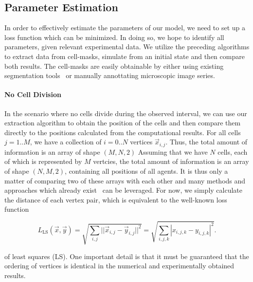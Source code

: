 \documentclass{article}
\begin{document}
\subsection{Parameter Estimation}
\label{section:parameter-estimation}
In order to effectively estimate the parameters of our model, we need to set up a loss function
which can be minimized.
In doing so, we hope to identify all parameters, given relevant experimental data.
We utilize the preceding algorithms to extract data from cell-masks, simulate from an initial state
and then compare both results.
The cell-masks are easily obtainable by either using existing segmentation
tools~\cite{Cutler2022,Stringer2020,Hardo2022} or manually annottating microscopic image series.

\paragraph{No Cell Division}
In the scenario where no cells divide during the observed interval, we can use our extraction
algorithm to obtain the position of the cells and then compare them directly to the positions
calculated from the computational results.
For all cells $j=1..M$, we have a collection of $i=0..N$ vertices $\vec{x}_{i,j}$.
Thus, the total amount of information is an array of shape $(M,N,2)$
Assuming that we have $N$ cells, each of which is represented by $M$ vertcies, the total amount of
information is an array of shape $(N,M,2)$, containing all positions of all agents.
It is thus only a matter of comparing two of these arrays with each other and many methods and
approaches which already exist~\cite{Wang2020} can be leveraged.
For now, we simply calculate the distance of each vertex pair, which is equivalent to the
well-known loss function

\begin{equation}
    L_{\text{LS}}(\vec{x}, \vec{y})
        = \sqrt{\sum\limits_{i,j}||\vec{x}_{i,j}-\vec{y}_{i,j}||^2}
        = \sqrt{\sum\limits_{i,j,k}|x_{i,j,k}-y_{i,j,k}|^2}.
\end{equation}

of least squares (LS).
One important detail is that it must be guaranteed that the ordering of vertices is identical in the
numerical and experimentally obtained results.
\end{document}
